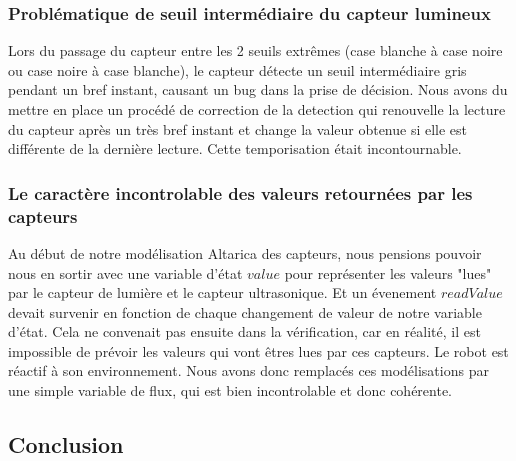 \subsubsection{Problématique de seuil intermédiaire du capteur lumineux}

Lors du passage du capteur entre les 2 seuils extrêmes (case blanche à case noire ou case noire à case blanche), le capteur détecte un seuil intermédiaire gris pendant un bref instant, causant un bug dans la prise de décision. Nous avons du mettre en place un procédé de correction de la detection qui renouvelle la lecture du capteur après un très bref instant et change la valeur obtenue si elle est différente de la dernière lecture. Cette temporisation était incontournable.

\subsubsection{Le caractère incontrolable des valeurs retournées par les capteurs}

Au début de notre modélisation Altarica des capteurs, nous pensions pouvoir nous en sortir avec une variable d'état $value$ pour représenter les valeurs "lues" par le capteur de lumière et le capteur ultrasonique. Et un évenement $readValue$ devait survenir en fonction de chaque changement de valeur de notre variable d'état. Cela ne convenait pas ensuite dans la vérification, car en réalité, il est impossible de prévoir les valeurs qui vont \^{e}tres lues par ces capteurs. Le robot est réactif à son environnement. Nous avons donc remplacés ces modélisations par une simple variable de flux, qui est bien incontrolable et donc cohérente.



\subsection{Conclusion}
